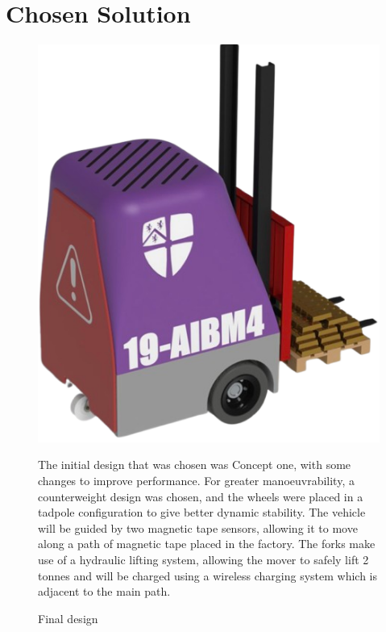 \documentclass[12pt]{article}
\begin{document}
\section{Chosen Solution}
\begin{figure}[ht]
    \centering
    \begin{minipage}[t]{0.27\textwidth}
        \vspace{0pt} 
        \centering
        \includegraphics[width=\linewidth]{finaldesign1rb.png}  
        \vspace{-15pt}
        \caption{Final design}
        \label{fig:x}
    \end{minipage}%
    \hfill
    \begin{minipage}[t]{0.68\textwidth}
        The initial design that was chosen was Concept one, with some changes to improve performance. For greater manoeuvrability, a counterweight design was chosen, and the wheels were placed in a tadpole configuration to give better dynamic stability. The vehicle will be guided by two magnetic tape sensors, allowing it to move along a path of magnetic tape placed in the factory. The forks make use of a hydraulic lifting system, allowing the mover to safely lift 2 tonnes and will be charged using a wireless charging system which is adjacent to the main path. 
    \end{minipage}
\end{figure}
\end{document}
